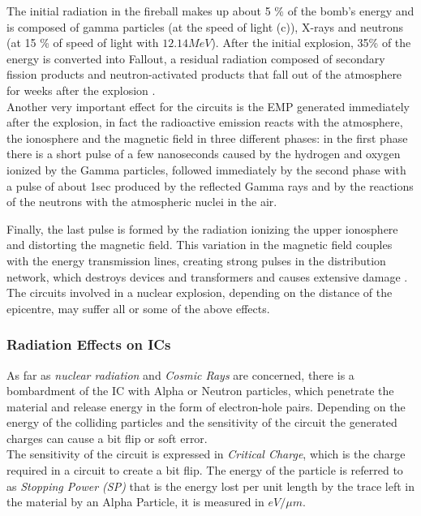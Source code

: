 {{{{{					The initial radiation in the fireball makes up about 5 \% of the bomb's energy and is composed of gamma particles (at the speed of light (c)), X-rays and neutrons (at 15 \% of speed of light with $12.14MeV$). After the initial explosion, 35\% of the energy is converted into Fallout, a residual radiation composed of secondary fission products and neutron-activated products that fall out of the atmosphere for weeks after the explosion .\\
					
					Another very important effect for the circuits is the EMP generated immediately after the explosion, in fact the radioactive emission reacts with the atmosphere, the ionosphere and the magnetic field in three different phases: in the first phase there is a short pulse of a few nanoseconds caused by the hydrogen and oxygen ionized by the Gamma particles, followed immediately by the second phase with a pulse of about 1sec produced by the reflected Gamma rays and by the reactions of the neutrons with the atmospheric nuclei in the air. 
					
					Finally, the last pulse is formed by the radiation ionizing the upper ionosphere and distorting the magnetic field. This variation in the magnetic field couples with the energy transmission lines, creating strong pulses in the distribution network, which destroys devices and transformers and causes extensive damage .\\
					
					The circuits involved in a nuclear explosion, depending on the distance of the epicentre, may suffer all or some of the above effects.
				}%
			
			}%
		
		
			\subsubsection{Radiation Effects on ICs}{
				As far as \textit{nuclear radiation} and \textit{Cosmic Rays} are concerned, there is a bombardment of the IC with Alpha or Neutron particles, which penetrate the material and release energy in the form of electron-hole pairs. Depending on the energy of the colliding particles and the sensitivity of the circuit the generated charges can cause a bit flip or soft error. \\
				
				The sensitivity of the circuit is expressed in \textit{Critical Charge}, which is the charge required in a circuit to create a bit flip. The energy of the particle is referred to as \textit{Stopping Power (SP)} that is the energy lost per unit length by the trace left in the material by an Alpha Particle, it is measured in $eV/\mu m$.
				
}}}}
